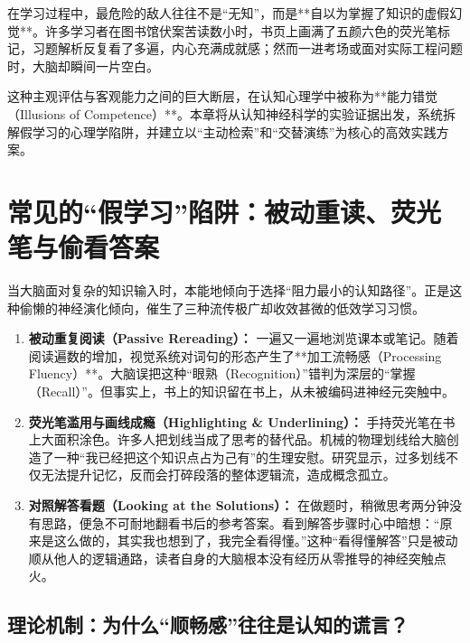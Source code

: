 \documentclass[12pt,a4paper,openany]{ctexbook}
\begin{document}
在学习过程中，最危险的敌人往往不是“无知”，而是**自以为掌握了知识的虚假幻觉**。许多学习者在图书馆伏案苦读数小时，书页上画满了五颜六色的荧光笔标记，习题解析反复看了多遍，内心充满成就感；然而一进考场或面对实际工程问题时，大脑却瞬间一片空白。

这种主观评估与客观能力之间的巨大断层，在认知心理学中被称为**能力错觉（Illusions of Competence）**。本章将从认知神经科学的实验证据出发，系统拆解假学习的心理学陷阱，并建立以“主动检索”和“交替演练”为核心的高效实践方案。

\section{常见的“假学习”陷阱：被动重读、荧光笔与偷看答案}

当大脑面对复杂的知识输入时，本能地倾向于选择“阻力最小的认知路径”。正是这种偷懒的神经演化倾向，催生了三种流传极广却收效甚微的低效学习习惯。

\begin{warningbox}[三大经典能力错觉陷阱]
\begin{enumerate}
    \item \textbf{被动重复阅读（Passive Rereading）：} 
    一遍又一遍地浏览课本或笔记。随着阅读遍数的增加，视觉系统对词句的形态产生了**加工流畅感（Processing Fluency）**。大脑误把这种“眼熟（Recognition）”错判为深层的“掌握（Recall）”。但事实上，书上的知识留在书上，从未被编码进神经元突触中。
    
    \item \textbf{荧光笔滥用与画线成瘾（Highlighting \& Underlining）：} 
    手持荧光笔在书上大面积涂色。许多人把划线当成了思考的替代品。机械的物理划线给大脑创造了一种“我已经把这个知识点占为己有”的生理安慰。研究显示，过多划线不仅无法提升记忆，反而会打碎段落的整体逻辑流，造成概念孤立。
    
    \item \textbf{对照解答看题（Looking at the Solutions）：} 
    在做题时，稍微思考两分钟没有思路，便急不可耐地翻看书后的参考答案。看到解答步骤时心中暗想：“原来是这么做的，其实我也想到了，我完全看得懂。”这种“看得懂解答”只是被动顺从他人的逻辑通路，读者自身的大脑根本没有经历从零推导的神经突触点火。
\end{enumerate}
\end{warningbox}

\subsection*{理论机制：为什么“顺畅感”往往是认知的谎言？}
\end{document}
